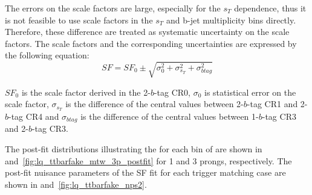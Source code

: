 The errors on the scale factors are large, especially for the $s_T$ dependence, thus it is not feasible to use scale factors in the 
$s_T$ and b-jet multiplicity bins directly. Therefore, these difference are treated as systematic uncertainty on the scale factors.
The scale factors and the corresponding uncertainties are expressed by the following equation:
\begin{equation}
  SF = SF_0 \pm \sqrt{\sigma_0^2 + \sigma_{s_T}^2 + \sigma_{btag}^2}
  \label{eq:LQ:ttbarfakeSF}
\end{equation}

$SF_0$ is the scale factor derived in the 2-$b$-tag CR0, $\sigma_0$ is statistical error on the scale factor,
$\sigma_{s_T}$ is the difference of the central values between 2-$b$-tag CR1 and 2-$b$-tag CR4 and
$\sigma_{btag}$ is the difference of the central values between 1-$b$-tag CR3 and 2-$b$-tag CR3.

The post-fit distributions illustrating the \mtw for each bin of \tauhad \pT are shown in  and~\ref{fig:lq_ttbarfake_mtw_3p_postfit} for 1 and 3 prongs, respectively. The post-fit nuisance parameters of the SF fit for each 
trigger matching case are shown in  and~\ref{fig:lq_ttbarfake_nps2}. 

